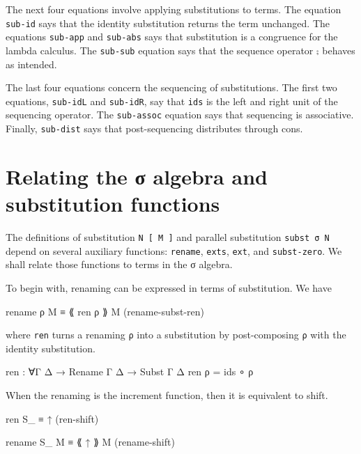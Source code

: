 The next four equations involve applying substitutions to terms. The
equation \texttt{sub-id} says that the identity substitution returns the
term unchanged. The equations \texttt{sub-app} and \texttt{sub-abs} says
that substitution is a congruence for the lambda calculus. The
\texttt{sub-sub} equation says that the sequence operator \texttt{⨟}
behaves as intended.

The last four equations concern the sequencing of substitutions. The
first two equations, \texttt{sub-idL} and \texttt{sub-idR}, say that
\texttt{ids} is the left and right unit of the sequencing operator. The
\texttt{sub-assoc} equation says that sequencing is associative.
Finally, \texttt{sub-dist} says that post-sequencing distributes through
cons.

\hypertarget{relating-the-ux3c3-algebra-and-substitution-functions}{%
\section{Relating the σ algebra and substitution
functions}\label{relating-the-ux3c3-algebra-and-substitution-functions}}

The definitions of substitution \texttt{N\ {[}\ M\ {]}} and parallel
substitution \texttt{subst\ σ\ N} depend on several auxiliary functions:
\texttt{rename}, \texttt{exts}, \texttt{ext}, and \texttt{subst-zero}.
We shall relate those functions to terms in the σ algebra.

To begin with, renaming can be expressed in terms of substitution. We
have

\begin{myDisplay}
rename ρ M ≡ ⟪ ren ρ ⟫ M               (rename-subst-ren)
\end{myDisplay}

where \texttt{ren} turns a renaming \texttt{ρ} into a substitution by
post-composing \texttt{ρ} with the identity substitution.

\begin{fence}
\begin{code}
ren : ∀{Γ Δ} → Rename Γ Δ → Subst Γ Δ
ren ρ = ids ∘ ρ
\end{code}
\end{fence}

When the renaming is the increment function, then it is equivalent to
shift.

\begin{myDisplay}
ren S_ ≡ ↑                             (ren-shift)

rename S_ M ≡ ⟪ ↑ ⟫ M                  (rename-shift)
\end{myDisplay}

